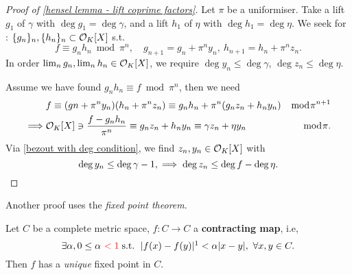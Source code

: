 \begin{proof}[Proof of \cref{hensel lemma - lift coprime factors}]
    Let $\pi$ be a uniformiser.
    Take a lift $g_1$ of $\gamma$ with $\deg g_1 = \deg \gamma$, and a lift $h_1$ of $\eta$ with $\deg h_1 = \deg\eta$.
    We seek for : $\{g_n\}_n, \{h_n\}_n\subset\mathcal{O}_K[X]$ s.t. \[f \equiv g_nh_n\bmod \pi^n,\quad g_{n + 1} = g_n + \pi^ny_n,\ h_{n+1} = h_n + \pi^nz_n .\]
    In order $\lim_n g_n, \lim_n h_n\in\mathcal{O}_K[X]$,
    we require $\deg y_n \le \deg \gamma$, $\deg z_n\le \deg \eta$.

    Assume we have found $g_nh_n\equiv f\bmod \pi^n$,
    then we need\begin{align*}
        &{} f\equiv (gn+\pi^ny_n)(h_n + \pi^nz_n)\equiv g_nh_n + \pi^n(g_nz_n + h_ny_n) &\bmod \pi^{n+1}\\
        \implies & \mathcal{O}_K[X]\ni \frac{f - g_nh_n}{\pi^n}\equiv g_nz_n+h_ny_n \equiv \gamma z_n + \eta y_n&\bmod\pi.
    \end{align*}
    Via \cref{bezout with deg condition},
    we find $z_n, y_n\in\mathcal{O}_K[X]$ with \[\deg y_n\le\deg\gamma -1,\implies\deg z_n \le \deg f - \deg\eta.\qedhere\]
\end{proof}


Another proof uses the \textit{fixed point theorem}.
\begin{lemma}
    Let $C$ be a complete metric space, $f : C\to C$ a \textbf{contracting map}, i.e, \[\exists\alpha, 0\le \alpha\ {\color{red}< 1} \st\ |f(x) - f(y)|\footnotemark <\alpha |x-y|,\ \forall x, y\in C. \]
    Then $f$ has a \textit{unique} fixed point in $C$.
\end{lemma}


